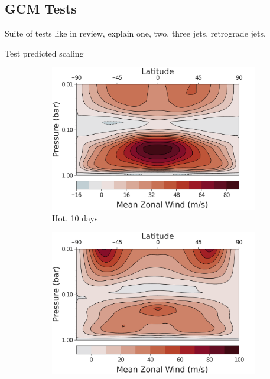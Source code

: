 \subsection{GCM Tests}

Suite of tests like in review, explain one, two, three jets, retrograde jets.

Test predicted scaling

\begin{figure}
  \centering
  \begin{subfigure}[b]{0.32\textwidth}
    \includegraphics[width=\textwidth]{figures/eqm-zonal-flow/wind-hot-10.pdf}
    \caption{Hot, 10 days}
  \end{subfigure}
  \begin{subfigure}[b]{0.32\textwidth}
    \includegraphics[width=\textwidth]{figures/eqm-zonal-flow/wind-med-10.pdf}

\end{subfigure}
\end{figure}

